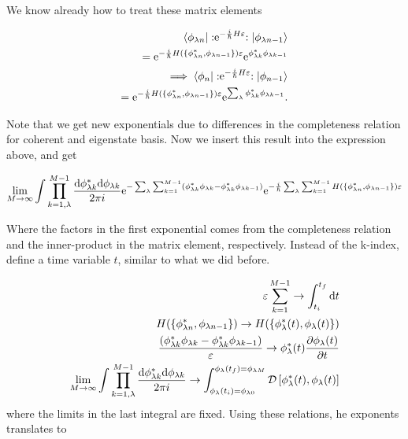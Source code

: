 We know already how to treat these matrix elements

\begin{align*}
    \bra{\phi_{\lambda n}} :\mathrel{\mathrm{e}^{-\frac{i}{\hbar} H \varepsilon}}:\ket{\phi_{\lambda n-1}} \\ = \mathrm{e}^{-\frac{i}{\hbar} H(\{\phi_{\lambda n}^{*}, \phi_{\lambda n-1}\}) \varepsilon } \mathrm{e}^{\phi_{\lambda k}^{*}\phi_{\lambda k-1}} \\ 
    \implies \bra{\phi_{n}} :\mathrel{\mathrm{e}^{-\frac{i}{\hbar} H \varepsilon}}:\ket{\phi_{n-1}} \\ = \mathrm{e}^{-\frac{i}{\hbar} H(\{\phi_{\lambda n}^{*}, \phi_{\lambda n-1}\} ) \varepsilon} \mathrm{e}^{\sum_{\lambda} \phi_{\lambda k}^{*}\phi_{\lambda k-1}}.
\end{align*}

Note that we get new exponentials due to differences in the completeness relation for coherent and eigenstate basis. Now we insert this result into the expression above, and get

\begin{align*}
    \lim_{M \to \infty} \int \prod_{k = 1, \lambda}^{M-1} \frac{\dd \phi_{\lambda k}^{*} \dd \phi_{\lambda k}}{2\pi i} \mathrm{e}^{-\sum_{\lambda} \sum_{k = 1}^{M-1}\left(\phi_{\lambda k}^{*} \phi_{\lambda k} - \phi_{\lambda k}^{*} \phi_{\lambda k - 1}\right)} \mathrm{e}^{-\frac{i}{\hbar} \sum_{\lambda} \sum_{k = 1}^{M-1} H(\{\phi_{\lambda n}^{*}, \phi_{\lambda n-1}\} ) \varepsilon}
\end{align*}

Where the factors in the first exponential comes from the completeness relation and the inner-product in the matrix element, respectively. Instead of the k-index, define a time variable $t$, similar to what we did before. 

\begin{align*}
    \varepsilon \sum_{k = 1}^{M-1}  \to \int_{t_{i}}^{t_{f}} \dd t \\ 
    H(\{\phi_{\lambda n}^{*}, \phi_{\lambda n-1}\} ) \to H(\{\phi_{\lambda}^{*}(t), \phi_{\lambda} (t)\} ) \\ 
    \frac{\left(\phi_{\lambda k}^{*} \phi_{\lambda k} - \phi_{\lambda k}^{*} \phi_{\lambda k - 1}\right)}{\varepsilon} \to \phi_{\lambda}^{*}(t) \pdv{\phi_{\lambda}(t)}{t} \\
    \lim_{M \to \infty} \int \prod_{k = 1, \lambda}^{M-1} \frac{\dd \phi_{\lambda k}^{*} \dd \phi_{\lambda k}}{2\pi i} \to \int_{\phi_{\lambda}(t_{i}) = \phi_{\lambda 0}}^{\phi_{\lambda}(t_{f}) = \phi_{\lambda M}} \mathcal{D} \left[\phi_{\lambda}^{*}(t), \phi_{\lambda} (t)\right]
\end{align*}
 where the limits in the last integral are fixed. Using these relations, he exponents translates to 
 

